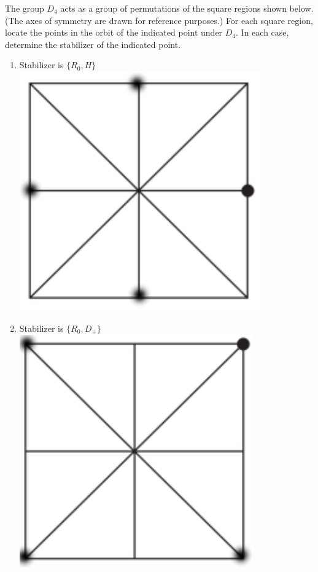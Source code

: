 \documentclass[12pt]{article}
\makeatletter
\theoremstyle{homework}
\newenvironment{exercise}[1]
{\def\@currentlabel{#1}\exercisecore}
{\endexercisecore}
\makeatother
\begin{document}
\begin{exercise}{7.60}
The group $D_4$ acts as a group of permutations of the square regions shown below. (The axes of symmetry are drawn for reference purposes.) For each square region, locate the points in the orbit of the indicated point under $D_4$. In each case, determine the stabilizer of the indicated point.\\
\begin{enumerate}
\item
Stabilizer is $\{R_0,H\}$\\
\includegraphics[scale=.3]{../octave/1.pdf}
\item
Stabilizer is $\{R_0,D_+\}$\\
\includegraphics[scale=.3]{../octave/2.pdf}

\end{enumerate}
\end{exercise}
\end{document}
